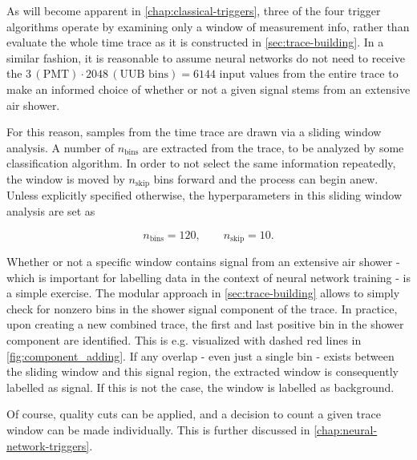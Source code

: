 As will become apparent in \autoref{chap:classical-triggers}, three of the four trigger algorithms operate by examining only a window of measurement info, rather
than evaluate the whole time trace as it is constructed in \autoref{sec:trace-building}. In a similar fashion, it is reasonable to assume neural networks do not 
need to receive the $3\,(\text{PMT})\cdot2048\,(\text{UUB bins}) = 6144$ input values from the entire trace to make an informed choice of whether or not a given
signal stems from an extensive air shower.

For this reason, samples from the time trace are drawn via a sliding window analysis. A number of $n_\text{bins}$ are extracted from the trace, to be analyzed 
by some classification algorithm. In order to not select the same information repeatedly, the window is moved by $n_\text{skip}$ bins forward and the process
can begin anew. Unless explicitly specified otherwise, the hyperparameters in this sliding window analysis are set as 

\begin{equation}
	\label{eq:sliding-window-analysis-hyperparameters}
	n_\text{bins} = 120, \qquad n_\text{skip} = 10.
\end{equation}

Whether or not a specific window contains signal from an extensive air shower - which is important for labelling data in the context of neural network training -
is a simple exercise. The modular approach in \autoref{sec:trace-building} allows to simply check for nonzero bins in the shower signal component of the trace.
In practice, upon creating a new combined trace, the first and last positive bin in the shower component are identified. This is e.g. visualized with dashed red 
lines in \autoref{fig:component_adding}. If any overlap - even just a single bin - exists between the sliding window and this signal region, the extracted window
is consequently labelled as signal. If this is not the case, the window is labelled as background.

Of course, quality cuts can be applied, and a decision to count a given trace window can be made individually. This is further discussed in 
\autoref{chap:neural-network-triggers}.